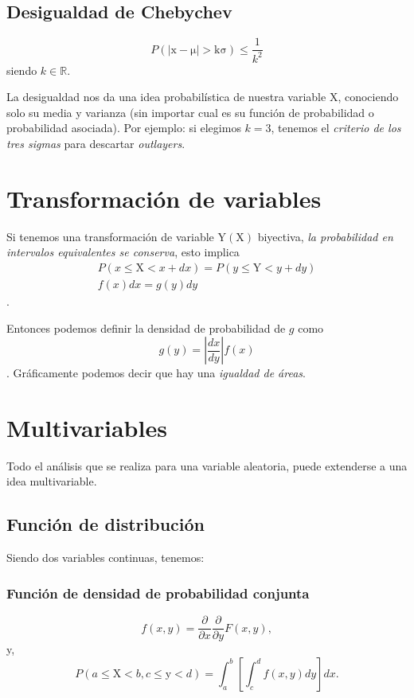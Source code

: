 \documentclass[openany]{book}
\begin{document}
\subsection{Desigualdad de Chebychev}
\begin{equation}
  \label{eq:Chebychev}
  P(\mathrm{|\mathrm{x}-\mu|>k\sigma})\leq\frac{1}{k^2}
\end{equation}
siendo $k\in\mathbb{R}$.
\par La desigualdad nos da una idea probabilística de nuestra variable $\mathrm{X}$, conociendo solo su media y varianza (sin importar cual es su función de probabilidad o probabilidad asociada). Por ejemplo: si elegimos $k=3$, tenemos el \emph{criterio de los tres sigmas} para descartar \emph{outlayers}.

\section{Transformación de variables}
Si tenemos una transformación de variable $\mathrm{Y(X)}$ biyectiva, \emph{la probabilidad en intervalos equivalentes se conserva}, esto implica
\begin{gather*}
  P(x\leq\mathrm{X}<x+dx)=P(y\leq\mathrm{Y}<y+dy)\\
  f(x)dx=g(y)dy
\end{gather*}.
\par Entonces podemos definir la densidad de probabilidad de $g$ como
\begin{equation}
  \label{eq:gdy}
  g(y)=\left|\frac{dx}{dy}\right|f(x)
\end{equation}.
Gráficamente podemos decir que hay una \emph{igualdad de áreas}.

\section{Multivariables}
Todo el análisis que se realiza para una variable aleatoria, puede extenderse a una idea multivariable.

\subsection{Función de distribución}
Siendo dos variables continuas, tenemos:
\subsubsection*{Función de densidad de probabilidad conjunta}
\begin{equation}
  f(x,y)=\frac{\partial }{\partial x}\frac{\partial }{\partial y}F(x,y),
  \label{eq:f_xy}
\end{equation}
y,
\begin{equation}
  P(a\leq\mathrm{X}<b,c\leq\mathrm{y}<d)=\int_{a}^{b}\left[\int_{c}^{d}f(x,y)dy\right]dx.
\end{equation}
\end{document}
